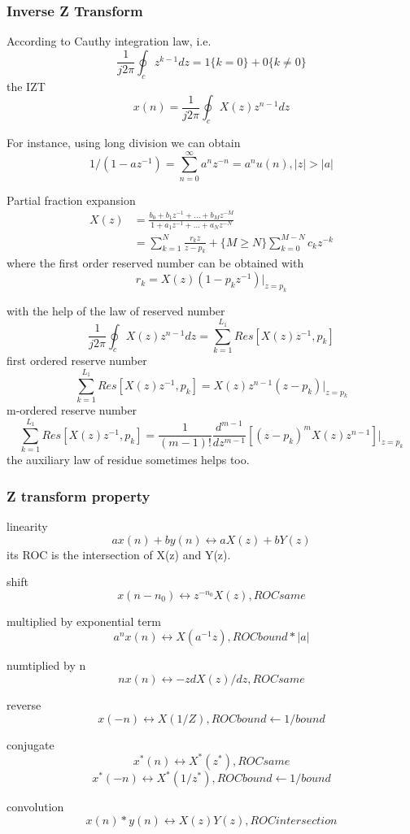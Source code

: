 \subsubsection{Inverse Z Transform}
According to Cauthy integration law, i.e.
\[ \frac{1}{j2\pi} \oint_c z^{k-1} dz = 1 \{k = 0\} + 0 \{k \neq 0\} \]
the IZT
\[ x(n) = \frac{1}{j2\pi} \oint_c X(z)z^{n-1} dz \]

For instance, using long division we can obtain 
\[ 1/(1-az^{-1}) = \sum_{n=0}^\infty a^n z^{-n} = a^n u(n) , |z|>|a|\]

Partial fraction expansion
\begin{align*}
X(z) &= \frac{b_0 + b_1 z^{-1} + \ldots + b_M z^{-M}}{1 + a_1 z^{-1} + \ldots + a_N z^{-N}} \\
&= \sum_{k=1}^N \frac{r_k z}{z - p_k} + \{M\geq N\} \sum_{k=0}^{M-N} c_k z^{-k}
\end{align*}
where the first order reserved number can be obtained with
\[ r_k = X(z)(1-p_k z^{-1}) \big|_{z=p_k} \]

with the help of the law of reserved number
\[ \frac{1}{j2\pi} \oint_c X(z)z^{n-1} dz = \sum_{k=1}^{L_1} Res[X(z)z^{-1}, p_k] \]
first ordered reserve number
\[ \sum_{k=1}^{L_1} Res[X(z)z^{-1}, p_k] = X(z)z^{n-1}(z-p_k)|_{z=p_k} \]
m-ordered reserve number
\[ \sum_{k=1}^{L_1} Res[X(z)z^{-1}, p_k] = \frac{1}{(m-1)!} \frac{d^{m-1}}{dz^{m-1}}
 [(z-p_k)^m X(z) z^{n-1} ]|_{z=p_k} \]
the auxiliary law of residue sometimes helps too.

\subsubsection{Z transform property}

linearity
\[ ax(n)+by(n) \leftrightarrow aX(z)+bY(z)\]
its ROC is the intersection of X(z) and Y(z).

shift
\[ x(n-n_0) \leftrightarrow z^{-n_0}X(z), ROC same\]

multiplied by exponential term
\[ a^n x(n) \leftrightarrow X(a^{-1}z), ROC bound *|a| \]

numtiplied by n
\[ nx(n) \leftrightarrow -z dX(z)/dz, ROC same\]

reverse
\[ x(-n) \leftrightarrow X(1/Z), ROC bound \leftarrow 1/bound\]

conjugate
\[ x^*(n) \leftrightarrow X^*(z^*) , ROC same\]
\[ x^*(-n) \leftrightarrow X^*(1/z^*) , ROC bound \leftarrow 1/bound\]

convolution
\[ x(n)\ast y(n) \leftrightarrow X(z)Y(z), ROC intersection\]

